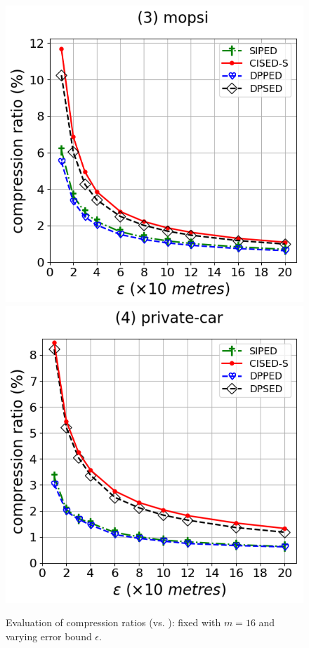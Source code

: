 {\begin{figure}[tb!]
\includegraphics[scale = 0.290]{Figures/Exp-CR-epsilon-ped-mopsi.png}\hspace{1ex}
\includegraphics[scale = 0.290]{Figures/Exp-CR-epsilon-ped-private.png}
\caption{\small Evaluation of compression ratios (\ped vs. \sed): fixed with $m=16$ and varying
  error bound $\epsilon$.}
\label{fig:cr-ped}
\end{figure}

}
